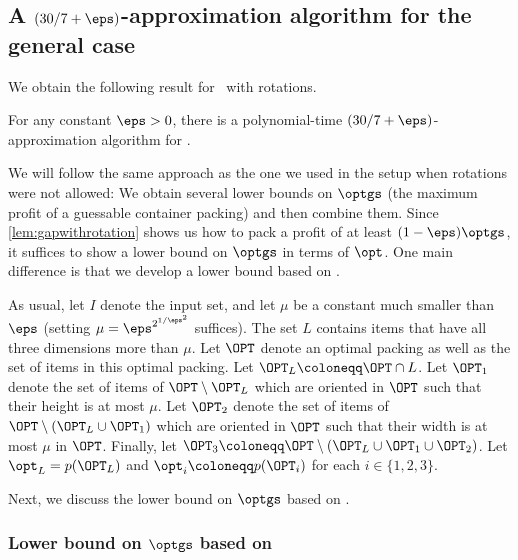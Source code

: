 \subsection{A \texorpdfstring{$(30/7+\eps)$}{(30/7 + ε)}-approximation algorithm for the general case}
\label{sec:rot-general-case}
We obtain the following result for \tdk~with rotations. 
\begin{theorem}
    \label{thm:3dkrot}
   For any constant $\eps>0$, there is a polynomial-time $(30/7+\eps)$-approximation algorithm for \tdkr. 
\end{theorem}

We will follow the same approach as the one we used in the setup when rotations were not allowed:
We obtain several lower bounds on $\optgs$ (the maximum profit of a guessable container packing) and then combine them.
Since \cref{lem:gapwithrotation} shows us how to pack a profit of at least $(1-\eps)\optgs$, it suffices to show a lower bound on $\optgs$ in terms of $\opt$.
One main difference is that we develop a lower bound based on \LContainers. 

As usual, let $I$ denote the input set, and let $\mu$ be a constant much smaller than $\eps$ (setting $\mu=\eps^{2^{1/\eps^2}}$ suffices).
The set $L$ contains items that have all three dimensions more than $\mu$.
Let $\OPT$ denote an optimal packing as well as the set of items in this optimal packing. 
Let $\OPT_L\coloneqq \OPT\cap L$.
Let $\OPT_1$ denote the set of items of $\OPT\setminus \OPT_L$ which are oriented in $\OPT$
such that their height is at most $\mu$. Let $\OPT_2$ denote the set of items of $\OPT\setminus (\OPT_L\cup\OPT_1)$ which are oriented in $\OPT$
such that their width is at most $\mu$ in $\OPT$. Finally, let $\OPT_3\coloneqq\OPT\setminus(\OPT_L\cup\OPT_1\cup\OPT_2)$.
Let $\opt_L=p(\OPT_L)$ and $\opt_i\coloneqq p(\OPT_i)$ for each $i\in\{1,2,3\}$.

Next, we discuss the lower bound on $\optgs$ based on \LContainers{}.
\subsubsection{Lower bound on \texorpdfstring{$\optgs$}{optgs} based on \texorpdfstring{\LContainers}{L-Containers}}
\label{sec:7by24guarantee}

